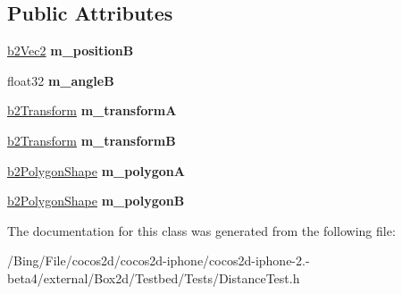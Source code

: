 \subsection*{Public Attributes}
\begin{DoxyCompactItemize}
\item 
\hypertarget{class_distance_test_a9809261d0e4b15046871ba74550aee93}{\hyperlink{structb2_vec2}{b2\-Vec2} {\bfseries m\-\_\-position\-B}}\label{class_distance_test_a9809261d0e4b15046871ba74550aee93}

\item 
\hypertarget{class_distance_test_a3d7c94fd3a86b2ba9c31aecc6de24f9a}{float32 {\bfseries m\-\_\-angle\-B}}\label{class_distance_test_a3d7c94fd3a86b2ba9c31aecc6de24f9a}

\item 
\hypertarget{class_distance_test_a23f4ff38aa7f44de9d20d263637838db}{\hyperlink{structb2_transform}{b2\-Transform} {\bfseries m\-\_\-transform\-A}}\label{class_distance_test_a23f4ff38aa7f44de9d20d263637838db}

\item 
\hypertarget{class_distance_test_ac0a6fec391b22f5fa878e157f31d8073}{\hyperlink{structb2_transform}{b2\-Transform} {\bfseries m\-\_\-transform\-B}}\label{class_distance_test_ac0a6fec391b22f5fa878e157f31d8073}

\item 
\hypertarget{class_distance_test_a02b37d80a5f019661713b66c885a39fc}{\hyperlink{classb2_polygon_shape}{b2\-Polygon\-Shape} {\bfseries m\-\_\-polygon\-A}}\label{class_distance_test_a02b37d80a5f019661713b66c885a39fc}

\item 
\hypertarget{class_distance_test_a76d8368613003023220c40f47755bd92}{\hyperlink{classb2_polygon_shape}{b2\-Polygon\-Shape} {\bfseries m\-\_\-polygon\-B}}\label{class_distance_test_a76d8368613003023220c40f47755bd92}

\end{DoxyCompactItemize}


The documentation for this class was generated from the following file\-:\begin{DoxyCompactItemize}
\item 
/\-Bing/\-File/cocos2d/cocos2d-\/iphone/cocos2d-\/iphone-\/2.-\/beta4/external/\-Box2d/\-Testbed/\-Tests/Distance\-Test.\-h\end{DoxyCompactItemize}
